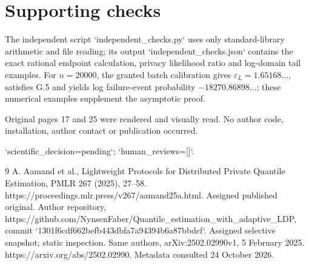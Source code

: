 \documentclass[10pt]{article}
\begin{document}
\section*{Supporting checks}
The independent script `independent\_checks.py` uses only standard-library arithmetic and file reading; its output `independent\_checks.json` contains the exact rational endpoint calculation, privacy likelihood ratio and log-domain tail examples. For \(n=20000\), the granted batch calibration gives \(\varepsilon_L=1.65168\ldots\), satisfies G.5 and yields log failure-event probability \(-18270.86898\ldots\); these numerical examples supplement the asymptotic proof.\par
Original pages 17 and 25 were rendered and visually read. No author code, installation, author contact or publication occurred.\par
`scientific\_decision=pending`; `human\_reviews=[]`.\par
9 A. Aamand et al., Lightweight Protocols for Distributed Private Quantile Estimation, PMLR 267 (2025), 27–58. https://proceedings.mlr.press/v267/aamand25a.html. Assigned published original. Author repository, https://github.com/NynsenFaber/Quantile\_estimation\_with\_adaptive\_LDP, commit `1301f6cdf662befb443dbfa7a94394b6a87bbdcf`. Assigned selective snapshot; static inspection. Same authors, arXiv:2502.02990v1, 5 February 2025. https://arxiv.org/abs/2502.02990. Metadata consulted 24 October 2026.\par
\end{document}
